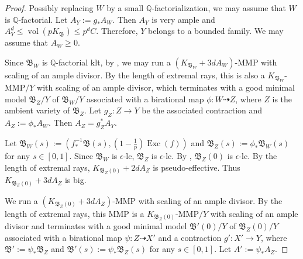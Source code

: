 \documentclass[11pt,reqno]{amsart}
\numberwithin{equation}{section}
\newcommand{\vol}{\operatorname{vol}}
\newcommand{\Exc}{\operatorname{Exc}}
\newcommand{\Bb}{{\mathfrak{B}}}
\theoremstyle{definition}
\begin{document}
\begin{proof}
Possibly replacing $W$ by a small $\mathbb Q$-factorialization, we may assume that $W$ is $\mathbb Q$-factorial. Let $A_Y:=g_*A_W$. Then $A_Y$ is very ample and $A_Y^d\leq\vol(pK_{\Bb})\leq p^dC$. Therefore, $Y$ belongs to a bounded family. We may assume that $A_W\geq 0$.

Since $\Bb_W$ is $\mathbb Q$-factorial klt, by \cite[Theorem~2.1.1]{Cas+25a}, we may run a $(K_{\Bb_W}+3dA_W)$-MMP with scaling of an ample divisor. By the length of extremal rays, this is also a $K_{\Bb_W}$-MMP$/Y$ with scaling of an ample divisor, which terminates with a good minimal model $\Bb_Z/Y$ of $\Bb_W/Y$ associated with a birational map $\phi\colon W\dashrightarrow Z$, where $Z$ is the ambient variety of $\Bb_Z$. Let $g_Z: Z\rightarrow Y$ be the associated contraction and $A_Z:=\phi_*A_W$. Then $A_Z=g_Z^*A_Y$. 

Let $\Bb_W(s):=\left(f^{-1}_*\Bb(s),\left(1-\frac{1}{p}\right)\Exc(f)\right)$
and $\Bb_Z(s):=\phi_*\Bb_W(s)$ for any $s\in [0,1]$. Since $\Bb_W$ is $\epsilon$-lc, $\Bb_Z$ is $\epsilon$-lc. By \cite[Proposition~9.1]{Cas+25a}, $\Bb_Z(0)$ is $\epsilon$-lc. By the length of extremal rays, $K_{\Bb_Z(0)}+2dA_Z$ is pseudo-effective. Thus $K_{\Bb_Z(0)}+3dA_Z$ is big.

We run a $(K_{\Bb_{Z}(0)}+3dA_Z)$-MMP with scaling of an ample divisor. By the length of extremal rays, this MMP is a $K_{\Bb_Z(0)}$-MMP$/Y$ with scaling of an ample divisor and terminates with a good minimal model $\Bb'(0)/Y$ of $\Bb_Z(0)/Y$ associated with a birational map $\psi: Z\dashrightarrow X'$ and a contraction $g': X'\rightarrow Y$, where $\Bb':=\psi_*\Bb_Z$ and $\Bb'(s):=\psi_*\Bb_Z(s)$ for any $s\in [0,1]$. Let $A':=\psi_*A_Z$.


\end{proof}
\end{document}
